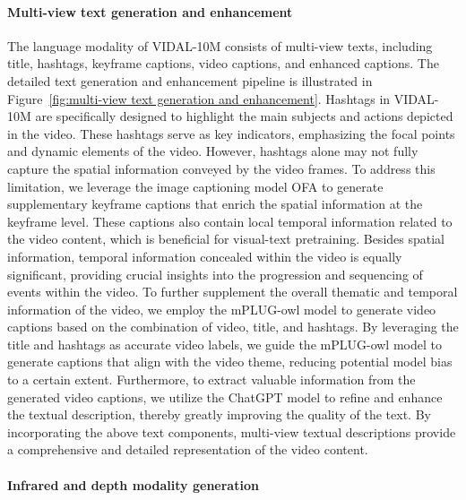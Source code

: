 \documentclass{article} \usepackage{iclr2024_conference,times}
\begin{document}
\paragraph{Multi-view text generation and enhancement}
The language modality of VIDAL-10M consists of multi-view texts, including title, hashtags, keyframe captions, video captions, and enhanced captions. The detailed text generation and enhancement pipeline is illustrated in Figure~\ref{fig:multi-view text generation and enhancement}. Hashtags in VIDAL-10M are specifically designed to highlight the main subjects and actions depicted in the video. These hashtags serve as key indicators, emphasizing the focal points and dynamic elements of the video. However, hashtags alone may not fully capture the spatial information conveyed by the video frames. To address this limitation, we leverage the image captioning model OFA  \citep{wang2022unifying} to generate supplementary keyframe captions that enrich the spatial information at the keyframe level. These captions also contain local temporal information related to the video content, which is beneficial for visual-text pretraining. Besides spatial information, temporal information concealed within the video is equally significant, providing crucial insights into the progression and sequencing of events within the video. To further supplement the overall thematic and temporal information of the video, we employ the mPLUG-owl model \citep{ye2023mplug} to generate video captions based on the combination of video, title, and hashtags. By leveraging the title and hashtags as accurate video labels, we guide the mPLUG-owl model to generate captions that align with the video theme, reducing potential model bias to a certain extent. Furthermore, to extract valuable information from the generated video captions, we utilize the ChatGPT model to refine and enhance the textual description, thereby greatly improving the quality of the text. By incorporating the above text components, multi-view textual descriptions provide a comprehensive and detailed representation of the video content. 



\paragraph{Infrared and depth modality generation}
\end{document}
